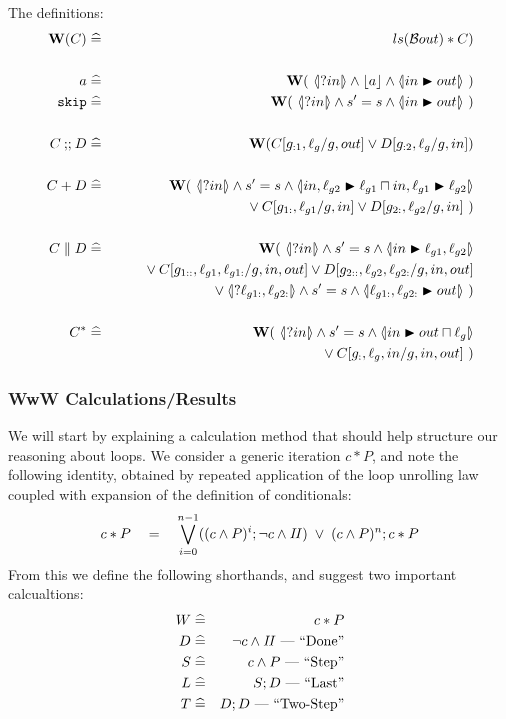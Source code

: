 The definitions:
\begin{eqnarray*}
   \W(C) &\defs& ls(\B{out}) * C)
\\
\\ a &\defs&\W(~\LS{in} \land \ado a \land \LUPD{in}{out}~)
\\ \cskip
   &\defs&
   \W(~\LS{in} \land \ss \land \LUPD{in}{out}~)
\\
\\ C \cseq D
   &\defs&
   \W(C[g_{:1},\ell_g/g,out] \lor D[g_{:2},\ell_g/g,in])
\\
\\ C + D
   &\defs&
   \W(~\LS{in}
   \land \ss
   \land \LNDC{in,\ell_{g2}}{\ell_{g1}}
                {in,\ell_{g1}}{\ell_{g2}}
\\ && \qquad {} \lor
   C[g_{1:},\ell_{g1}/g,in] \lor D[g_{2:},\ell_{g2}/g,in]~)
\\
\\ C \parallel D
   &\defs&
   \W(~\LS{in}
   \land \ss
   \land \LUPD{in}{\ell_{g1},\ell_{g2}}
\\ && \qquad {}\lor
   C[g_{1::},\ell_{g1},\ell_{g1:}/g,in,out]
   \lor D[g_{2::},\ell_{g2},\ell_{g2:}/g,in,out]
\\ && \qquad {}\lor
   \LS{\ell_{g1:},\ell_{g2:}}
   \land \ss
   \land \LUPD{\ell_{g1:},\ell_{g2:}}{out}~)
\\
\\ C^*
   &\defs&
   \W(~\LS{in}
   \land \ss
   \land \LUPD{in}{out \ndc \ell_g}
\\ && \qquad {}\lor
   C[g_{:},\ell_g,in/g,in,out]~)
\end{eqnarray*}

\subsubsection{WwW Calculations/Results}

We will start by explaining a calculation method
that should help structure our reasoning about loops.
We consider a generic iteration $c*P$,
and note the following identity,
obtained by repeated application of the loop unrolling law
coupled with expansion of the definition of conditionals:
\begin{equation}\label{eqn:unroll-n-times}
   c * P
   \quad=\quad
   \bigvee_{i=0}^{n-1} ( (c \land P)^i ; \lnot c \land \mathit{II})
   \;\lor\;
   (c \land P)^n ; c * P
\end{equation}
From this we define the following shorthands,
and suggest two important calcualtions:
\begin{eqnarray*}
   W &\mathrel{\widehat=}& c * P
\\ D &\mathrel{\widehat=}& \lnot c \land \mathit{II} \textrm{ --- ``Done''}
\\ S &\mathrel{\widehat=}& c \land P \textrm{ --- ``Step''}
\\ L &\mathrel{\widehat=}& S ; D \textrm{ --- ``Last''}
\\ T &\mathrel{\widehat=}& D ; D \textrm{ --- ``Two-Step''}
\end{eqnarray*}

